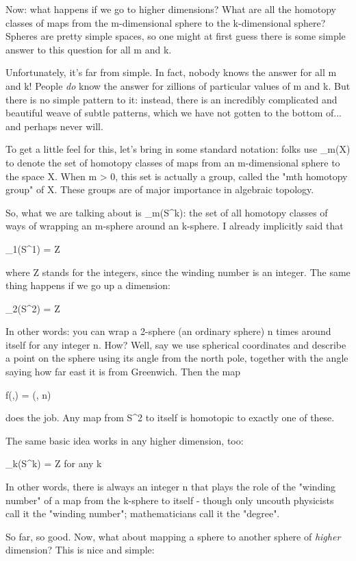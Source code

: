 Now: what happens if we go to higher dimensions?  What are all the
homotopy classes of maps from the m-dimensional sphere to the
k-dimensional sphere?  Spheres are pretty simple spaces, so one might at
first guess there is some simple answer to this question for all m and
k.

Unfortunately, it's far from simple.  In fact, nobody knows the answer
for all m and k!  People \emph{do} know the answer for zillions of particular
values of m and k.  But there is no simple pattern to it: instead, there
is an incredibly complicated and beautiful weave of subtle patterns,
which we have not gotten to the bottom of... and perhaps never will.

To get a little feel for this, let's bring in some standard notation:
folks use \pi _{m}(X) to denote the set of homotopy classes of maps from an
m-dimensional sphere to the space X.  When m > 0, this set is actually a
group, called the "mth homotopy group" of X.  These groups are of major
importance in algebraic topology.

So, what we are talking about is \pi _{m}(S^{k}): the set of all homotopy
classes of ways of wrapping an m-sphere around an k-sphere.  I already 
implicitly said that 

\pi _{1}(S^{1}) = Z

where Z stands for the integers, since the winding number is an
integer.  The same thing happens if we go up a dimension:

\pi _{2}(S^{2}) = Z   

In other words: you can wrap a 2-sphere (an ordinary sphere) n times around
itself for any integer n.  How?  Well, say we use spherical coordinates
and describe a point on the sphere using its angle \phi  from the north
pole, together with the angle \theta  saying how far east it is from
Greenwich.  Then the map

f(\phi ,\theta ) = (\phi , n\theta ) 

does the job.  Any map from S^{2} to itself is homotopic to exactly
one of these.

The same basic idea works in any higher dimension, too:

\pi _{k}(S^{k}) = Z                   for any k 

In other words, there is always an integer n that plays the role of the
"winding number" of a map from the k-sphere to itself - though only
uncouth physicists call it the "winding number"; mathematicians call
it the "degree".

So far, so good.  Now, what about mapping a sphere to another sphere of
\emph{higher} dimension?  This is nice and simple:

